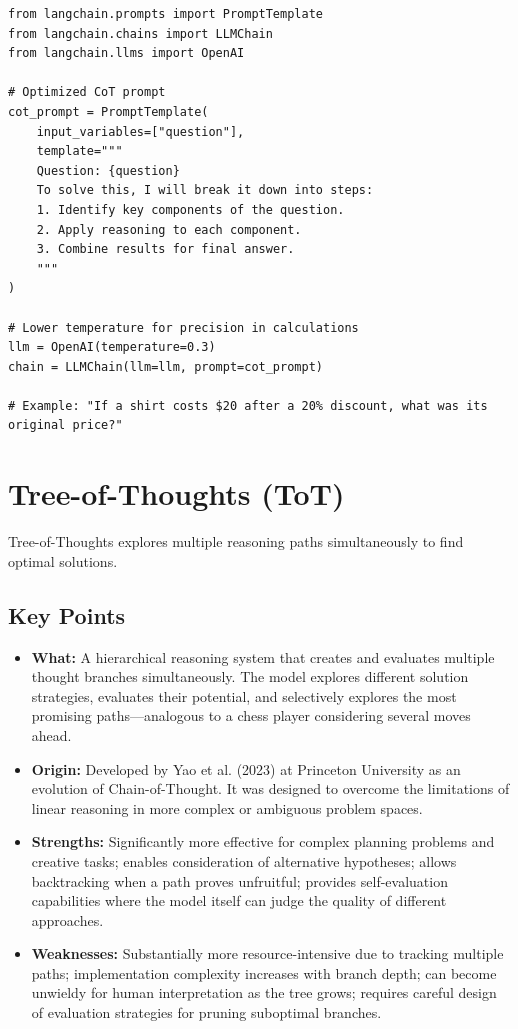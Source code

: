 \documentclass[12pt,letterpaper]{article}
\newenvironment{macterminal}{%
    \begin{mdframed}[
        linecolor=terminalFrame,
        backgroundcolor=terminalBg,
        roundcorner=5pt,
        skipabove=5pt,
        skipbelow=5pt,
        linewidth=1pt,
        innertopmargin=5pt,
        frametitle={%
            \tikz[baseline=(current bounding box.east), outer sep=0pt]{
                \fill[red!80!black] (0,0) circle (5pt);
                \fill[yellow!80!black] (0.7,0) circle (5pt);
                \fill[green!70!black] (1.4,0) circle (5pt);
            }
        },
        frametitlealignment=\raggedright,
        frametitleaboveskip=8pt,
        frametitlebelowskip=0pt,
    ]
}{%
    \end{mdframed}%
}
\begin{document}
\begin{macterminal}
\begin{lstlisting}
from langchain.prompts import PromptTemplate
from langchain.chains import LLMChain
from langchain.llms import OpenAI

# Optimized CoT prompt 
cot_prompt = PromptTemplate(
    input_variables=["question"],
    template="""
    Question: {question}
    To solve this, I will break it down into steps:
    1. Identify key components of the question.
    2. Apply reasoning to each component.
    3. Combine results for final answer.
    """
)

# Lower temperature for precision in calculations
llm = OpenAI(temperature=0.3)
chain = LLMChain(llm=llm, prompt=cot_prompt)

# Example: "If a shirt costs $20 after a 20% discount, what was its original price?"
\end{lstlisting}
\end{macterminal}

\section{Tree-of-Thoughts (ToT)}

Tree-of-Thoughts explores multiple reasoning paths simultaneously to find optimal solutions.

\subsection{Key Points}
\begin{itemize}
    \item \textbf{\textcolor{pythonBlue}{What:}} A hierarchical reasoning system that creates and evaluates multiple thought branches simultaneously. The model explores different solution strategies, evaluates their potential, and selectively explores the most promising paths—analogous to a chess player considering several moves ahead.
    
    \item \textbf{\textcolor{pythonBlue}{Origin:}} Developed by Yao et al. (2023) at Princeton University as an evolution of Chain-of-Thought. It was designed to overcome the limitations of linear reasoning in more complex or ambiguous problem spaces.
    
    \item \textbf{\textcolor{pythonBlue}{Strengths:}} Significantly more effective for complex planning problems and creative tasks; enables consideration of alternative hypotheses; allows backtracking when a path proves unfruitful; provides self-evaluation capabilities where the model itself can judge the quality of different approaches.
    
    \item \textbf{\textcolor{pythonBlue}{Weaknesses:}} Substantially more resource-intensive due to tracking multiple paths; implementation complexity increases with branch depth; can become unwieldy for human interpretation as the tree grows; requires careful design of evaluation strategies for pruning suboptimal branches.
\end{itemize}
\end{document}
